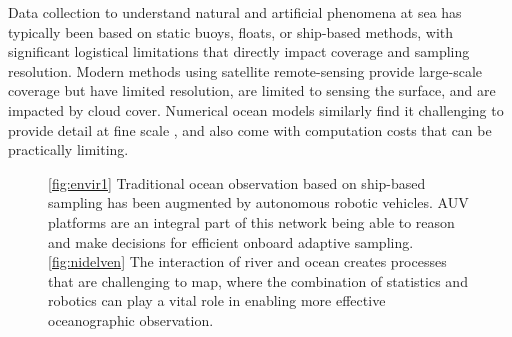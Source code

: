 \documentclass[aoas]{imsart}
\begin{document}
Data collection to understand natural and artificial phenomena at sea has typically been based on static buoys, floats, or ship-based methods,
with significant logistical limitations that directly impact coverage
and sampling resolution. Modern methods using satellite remote-sensing
provide large-scale coverage but have limited resolution, are limited
to sensing the surface, and are impacted by cloud cover. Numerical
ocean models similarly find it challenging to provide detail at fine
scale \citep{Lermusiaux:2006}, and also come with computation costs that can be practically limiting. 
%
\begin{figure}[!h] 
  \centering 
  \hfill
  \caption{\ref{fig:envir1} Traditional ocean observation based on 
    ship-based sampling has been augmented by autonomous
    robotic vehicles. %
    AUV platforms are an integral part of this network being able to
    reason and make decisions for efficient onboard adaptive sampling.
    \ref{fig:nidelven} The interaction of river and ocean creates
    processes that are challenging to map, where the combination of
    statistics and robotics can play a vital role in enabling more
    effective oceanographic observation.}
  \label{fig:envir} \end{figure}
\end{document}
